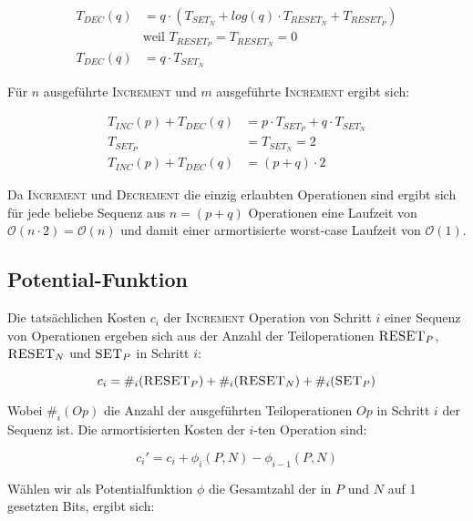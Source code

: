 \documentclass[parskip=half,a4paper]{scrartcl}
\begin{document}
\begin{equation}
\begin{aligned}
T_{DEC}(q) &= q \cdot (T_{SET_N} + log(q) \cdot T_{RESET_N} + T_{RESET_P}) \\
& \text{weil  $T_{RESET_P} = T_{RESET_N} = 0$} \\
T_{DEC}(q)  &= q \cdot T_{SET_N}
\end{aligned}
\end{equation}

Für $n$ ausgeführte \textsc{Increment} und $m$ ausgeführte \textsc{Increment} ergibt sich:

\begin{equation}
\begin{aligned}
T_{INC}(p) + T_{DEC}(q) &= p \cdot T_{SET_P} + q \cdot T_{SET_N}\\
T_{SET_P} &= T_{SET_N} = 2 \\
T_{INC}(p) + T_{DEC}(q) &= (p+q) \cdot 2
\end{aligned}
\end{equation}

Da \textsc{Increment} und \textsc{Decrement} die einzig erlaubten Operationen sind ergibt sich für jede beliebe Sequenz aus $n = (p+q)$ Operationen eine Laufzeit von $\mathcal{O}(n\cdot 2) = \mathcal{O}(n)$ und damit einer armortisierte worst-case Laufzeit von $\mathcal{O}(1)$.

\subsection*{Potential-Funktion}

Die tatsächlichen Kosten $c_i$ der \textsc{Increment} Operation von Schritt $i$ einer Sequenz von Operationen ergeben sich aus der Anzahl der Teiloperationen $\textsc{RESET}_P$, $\textsc{RESET}_N$ und $\textsc{SET}_P$ in Schritt $i$:

$$
c_i = \#_i(\textsc{RESET}_P) + \#_i(\textsc{RESET}_N) + \#_i(\textsc{SET}_P)
$$

Wobei $\#_i(\textit{Op})$ die Anzahl der ausgeführten Teiloperationen $\textit{Op}$ in Schritt $i$ der Sequenz ist. Die armortisierten Kosten der $i$-ten Operation sind:

\begin{equation}
c_i' = c_i + \phi_i(P,N) - \phi_{i-1}(P,N)
\end{equation}

Wählen wir als Potentialfunktion $\phi$ die Gesamtzahl der in $P$ und $N$ auf 1 gesetzten Bits, ergibt sich:
\end{document}
